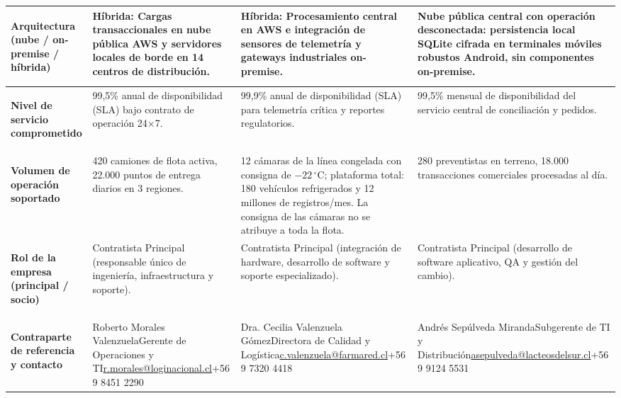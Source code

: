 \documentclass[11pt]{article}
\begin{document}
\begin{xltabular}{\linewidth}{@{}>{\bfseries\raggedright\arraybackslash}p{2.3cm} X X X@{}}
\textbf{Arquitectura (nube / on-premise / híbrida)} & Híbrida: Cargas transaccionales en nube pública AWS y servidores locales de borde en 14 centros de distribución. & Híbrida: Procesamiento central en AWS e integración de sensores de telemetría y gateways industriales on-premise. & Nube pública central con operación desconectada: persistencia local SQLite cifrada en terminales móviles robustos Android, sin componentes on-premise. \\
\midrule

\textbf{Nivel de servicio comprometido} & 99,5\% anual de disponibilidad (SLA) bajo contrato de operación 24$\times$7. & 99,9\% anual de disponibilidad (SLA) para telemetría crítica y reportes regulatorios. & 99,5\% mensual de disponibilidad del servicio central de conciliación y pedidos. \\
\midrule

\textbf{Volumen de operación soportado} & 420 camiones de flota activa, 22.000 puntos de entrega diarios en 3 regiones. & 12 cámaras de la línea congelada con consigna de $-22\,^{\circ}\mathrm{C}$; plataforma total: 180 vehículos refrigerados y 12 millones de registros/mes. La consigna de las cámaras no se atribuye a toda la flota. & 280 preventistas en terreno, 18.000 transacciones comerciales procesadas al día. \\
\midrule

\textbf{Rol de la empresa (principal / socio)} & Contratista Principal (responsable único de ingeniería, infraestructura y soporte). & Contratista Principal (integración de hardware, desarrollo de software y soporte especializado). & Contratista Principal (desarrollo de software aplicativo, QA y gestión del cambio). \\
\midrule

\textbf{Contraparte de referencia y contacto} & Roberto Morales Valenzuela\newline Gerente de Operaciones y TI\newline \url{r.morales@loginacional.cl}\newline +56 9 8451 2290 & Dra. Cecilia Valenzuela Gómez\newline Directora de Calidad y Logística\newline \url{c.valenzuela@farmared.cl}\newline +56 9 7320 4418 & Andrés Sepúlveda Miranda\newline Subgerente de TI y Distribución\newline \url{asepulveda@lacteosdelsur.cl}\newline +56 9 9124 5531 \\
\end{xltabular}
\endgroup
\restoregeometry
\end{document}
